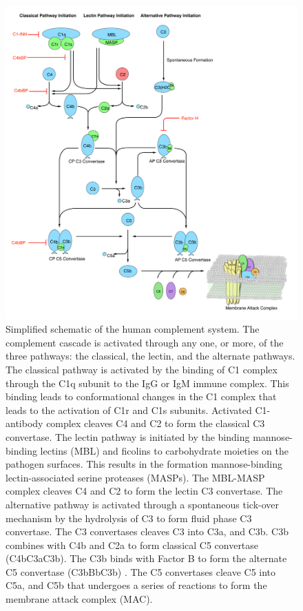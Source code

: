 \documentclass[12pt]{article}
\begin{document}
\clearpage




\clearpage


\begin{figure}[h]
\centering
\includegraphics[width=1.0\textwidth]{./figs/Fig1_Schematic_v2.pdf}
\caption{Simplified schematic of the human complement system. The complement cascade is activated through any one, or more, of the three pathways:  the classical, the lectin, and the alternate pathways. The classical pathway is activated by the binding of C1 complex through the C1q subunit to the IgG or IgM immune complex.  This binding leads to conformational changes in the C1 complex that leads to the activation of C1r and C1s subunits. Activated C1-antibody complex cleaves C4 and C2 to form the classical C3 convertase. The lectin pathway is initiated by the binding mannose-binding lectins (MBL) and ficolins to carbohydrate moieties on the pathogen surfaces. This results in the formation mannose-binding lectin-associated serine proteases (MASPs). The MBL-MASP complex cleaves C4 and C2 to form the lectin C3 convertase. The alternative pathway is activated through a spontaneous tick-over mechanism by the hydrolysis of C3 to form fluid phase C3 convertase. The C3 convertases  cleaves C3 into C3a, and C3b. C3b combines with C4b and C2a to form classical C5 convertase (C4bC3aC3b). The C3b binds with Factor B to form the alternate C5 convertase (C3bBbC3b) . The C5 convertases cleave C5 into C5a, and C5b that undergoes a series of reactions to form the membrane attack complex (MAC).}\label{fig-schematic}
\end{figure}
\end{document}

